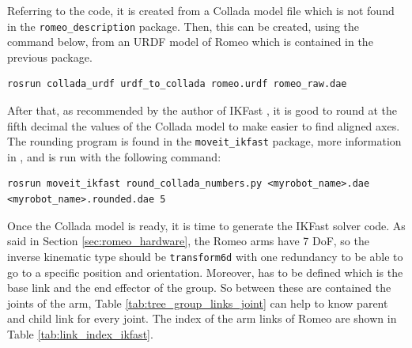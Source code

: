 \documentclass[12pt,a4paper,final,twoside,openright]{report}
\begin{document}
Referring to the code, it is created from a Collada model file which is not found in the \texttt{romeo\_description} package. Then, this can be created, using the command below, from an URDF model of Romeo which is contained in the previous package.

\begin{lstlisting}[language=ROS]
rosrun collada_urdf urdf_to_collada romeo.urdf romeo_raw.dae
\end{lstlisting}

After that, as recommended by the author of IKFast  \cite{Diankov2010}, it is good to round at the fifth decimal the values of the Collada model to make easier to find aligned axes. The rounding program is found in the \texttt{moveit\_ikfast} package, more information in \cite{MoveIt2013}, and is run with the following command:

\begin{lstlisting}[language=ROS]
rosrun moveit_ikfast round_collada_numbers.py <myrobot_name>.dae <myrobot_name>.rounded.dae 5
\end{lstlisting}

Once the Collada model is ready, it is time to generate the IKFast solver code. As said in Section \ref{sec:romeo_hardware}, the Romeo arms have 7 DoF, so the inverse kinematic type should be \texttt{transform6d} with one redundancy to be able to go to a specific position and orientation. Moreover, has to be defined which is the base link and the end effector of the group. So between these are contained the joints of the arm, Table \ref{tab:tree_group_links_joint} can help to know parent and child link for every joint. The index of the arm links of Romeo are shown in Table \ref{tab:link_index_ikfast}. 
\end{document}
